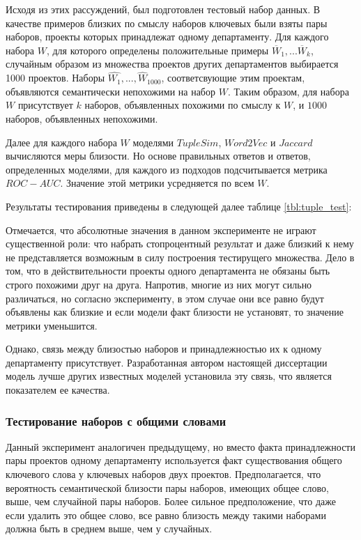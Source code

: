 Исходя из этих рассуждений, был подготовлен тестовый набор данных. В качестве примеров близких по смыслу наборов ключевых были взяты пары наборов, проекты которых принадлежат одному департаменту. Для каждого набора $W$, для которого определены положительные примеры $\overline{W}_{1}, ... \overline{W}_{k}$, случайным образом из множества проектов других департаментов выбирается 1000 проектов. Наборы $\hat{W_1}, ..., \hat{W}_{1000}$, соответсвующие этим проектам, объявляются семантически непохожими на набор $W$. Таким образом, для набора $W$ присутствует $k$ наборов, объявленных похожими по смыслу к $W$, и $1000$ наборов, объявленных непохожими.

Далее для каждого набора $W$ моделями $TupleSim$, $Word2Vec$ и  $Jaccard$ вычисляются меры близости. Но основе правильных ответов и ответов, определенных моделями, для каждого из подходов подсчитывается метрика $ROC-AUC$. Значение этой метрики усредняется по всем $W$.

Результаты тестирования приведены в следующей далее таблице \ref{tbl:tuple_test}:

Отмечается, что абсолютные значения в данном эксперименте не играют существенной роли: что набрать стопроцентный результат и даже близкий к нему не представляется возможным в силу построения тестирущего множества. Дело в том, что в действительности проекты одного департамента не обязаны быть строго похожими друг на друга. Напротив, многие из них могут сильно различаться, но согласно эксперименту, в этом случае они все равно будут объявлены как близкие и если модели факт близости не установят, то значение метрики уменьшится. 

Однако, связь между близостью наборов и принадлежностью их к одному департаменту присутствует. Разработанная автором настоящей диссертации модель лучше других известных моделей установила эту связь, что является показателем ее качества.

\subsubsection{Тестирование наборов с общими словами}

Данный эксперимент аналогичен предыдущему, но вместо факта принадлежности пары проектов одному департаменту используется факт существования общего ключевого слова у ключевых наборов двух проектов. Предполагается, что вероятность семантической близости пары наборов, имеющих общее слово, выше, чем случайной пары наборов. Более сильное предположение, что даже если удалить это общее слово, все равно близость между такими наборами должна быть в среднем выше, чем у случайных.

